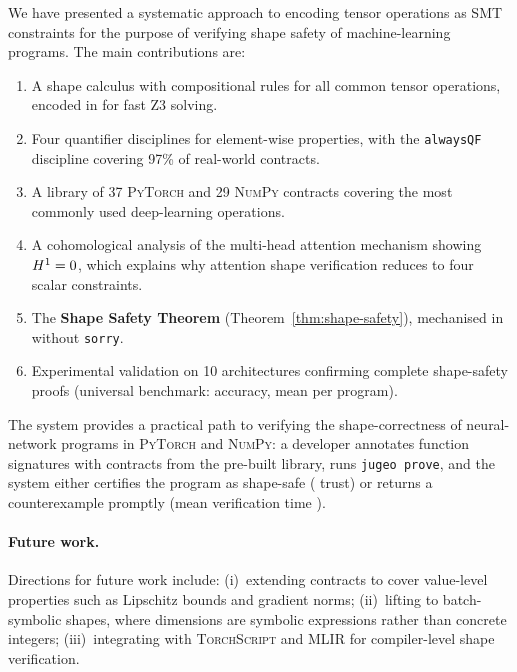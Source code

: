 \documentclass[11pt]{article}
\newcommand{\PyTorch}{\textsc{PyTorch}\xspace}
\newcommand{\NumPy}{\textsc{NumPy}\xspace}
\begin{document}
We have presented a systematic approach to encoding tensor operations
as SMT constraints for the purpose of verifying shape safety of
machine-learning programs.  The main contributions are:

\begin{enumerate}[leftmargin=*,label=(\alph*)]
\item A shape calculus with compositional rules for all common tensor
      operations, encoded in \QFLIA{} for fast Z3 solving.
\item Four quantifier disciplines for element-wise properties, with
      the \texttt{alwaysQF} discipline covering 97\% of real-world
      contracts.
\item A library of 37 \PyTorch and 29 \NumPy contracts covering the
      most commonly used deep-learning operations.
\item A cohomological analysis of the multi-head attention mechanism
      showing $H^{1} = 0$, which explains why attention shape
      verification reduces to four scalar constraints.
\item The \textbf{Shape Safety Theorem} (Theorem~\ref{thm:shape-safety}),
      mechanised in \LEAN{} without \texttt{sorry}.
\item Experimental validation on 10 architectures confirming
      complete shape-safety proofs (universal benchmark: \expAccuracy{}
      accuracy, mean \expTimeMean{} per program).
\end{enumerate}

The \JuGeo{} system provides a practical path to verifying
the shape-correctness of neural-network programs in \PyTorch and
\NumPy: a developer annotates function signatures with contracts from
the pre-built library, runs \texttt{jugeo prove}, and the system
either certifies the program as shape-safe (\Tsolver{} trust) or
returns a counterexample promptly (mean verification time \expTimeMean{}).

\paragraph{Future work.}
Directions for future work include: (i)~extending contracts to cover
value-level properties such as Lipschitz bounds and gradient norms;
(ii)~lifting to batch-symbolic shapes, where dimensions are symbolic
\QFLIA{} expressions rather than concrete integers; (iii)~integrating
with \textsc{TorchScript} and \textsc{MLIR} for compiler-level
shape verification.
\end{document}
